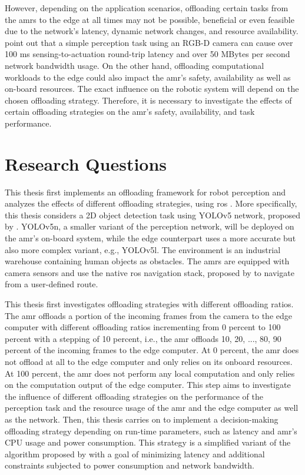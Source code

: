 However, depending on the application scenarios, offloading certain tasks from the \glspl{amr} to the edge at all times may not be possible, beneficial or even feasible due to the network's latency, dynamic network changes, and resource availability. \citeauthor*{Baxi2022} point out that a simple perception task using an RGB-D camera can cause over 100 ms sensing-to-actuation round-trip latency and over 50 MBytes per second network bandwidth usage. On the other hand, offloading computational workloads to the edge could also impact the \gls{amr}'s safety, availability as well as on-board resources. The exact influence on the robotic system will depend on the chosen offloading strategy. Therefore, it is necessary to investigate the effects of certain offloading strategies on the \gls{amr}'s safety, availability, and task performance.

\section{Research Questions}\label{sec:introduction:research_questions}

This thesis first implements an offloading framework for robot perception and analyzes the effects of different offloading strategies, using \gls{ros} \cite{Macenski2022}. More specifically, this thesis considers a 2D object detection task using YOLOv5 network, proposed by \citeauthor{Jocher2022}. YOLOv5n, a smaller variant of the perception network, will be deployed on the \gls{amr}'s on-board system, while the edge counterpart uses a more accurate but also more complex variant, e.g., YOLOv5l. The environment is an industrial warehouse containing human objects as obstacles. The \glspl{amr} are equipped with camera sensors and use the native \gls{ros} navigation stack, proposed by \citeauthor*{Macenski2020} to navigate from a user-defined route. 

This thesis first investigates offloading strategies with different offloading ratios. The \gls{amr} offloads a portion of the incoming frames from the camera to the edge computer with different offloading ratios incrementing from 0 percent to 100 percent with a stepping of 10 percent, i.e., the \gls{amr} offloads 10, 20, ..., 80, 90 percent of the incoming frames to the edge computer. At 0 percent, the \gls{amr} does not offload at all to the edge computer and only relies on its onboard resources. At 100 percent, the \gls{amr} does not perform any local computation and only relies on the computation output of the edge computer. This step aims to investigate the influence of different offloading strategies on the performance of the perception task and the resource usage of the \gls{amr} and the edge computer as well as the network. Then, this thesis carries on to implement a decision-making offloading strategy depending on run-time parameters, such as latency and \gls{amr}'s CPU usage and power consumption. This strategy is a simplified variant of the algorithm proposed by \citeauthor*{Ning2019} with a goal of minimizing latency and additional constraints subjected to power consumption and network bandwidth. 

